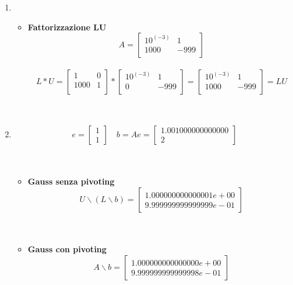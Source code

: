 \begin{enumerate}
	\item 
	\begin{itemize}
		\item \textbf{Fattorizzazione LU}
			\[
			A =\begin{bmatrix}
				10^{(-3)} &   1  \\
	 			1000   & -999 \\
			\end{bmatrix}
			\]\\
			\[
			L*U =\begin{bmatrix}
				1    & 0 \\
				1000 & 1 \\
			\end{bmatrix} *
			\begin{bmatrix}
				10^{(-3)} & 1    \\
				0      	  & -999 \\
			\end{bmatrix} 
			= \begin{bmatrix}
				10^{(-3)} &   1  \\
				1000   & -999 \\
			\end{bmatrix} = LU
			\]\\\
	\end{itemize}
	\item
		\[
		e = \begin{bmatrix}
			1 \\
			1
		\end{bmatrix} \quad 
		b = Ae =\begin{bmatrix}
			1.001000000000000 \\
			2                 
		\end{bmatrix}
		\]\\\
	\begin{itemize}
	\item \textbf{Gauss senza pivoting}
		\[
		U \backslash (L \backslash b) = \begin{bmatrix}
			1.000000000000001e+00 \\
    		9.999999999999999e-01
		\end{bmatrix}
		\]\\\
	\end{itemize}
	\begin{itemize}
	\item \textbf{Gauss con pivoting}
		\[
		A \backslash b =\begin{bmatrix}
			1.000000000000000e+00 \\
    		9.999999999999998e-01 
		\end{bmatrix}
		\]
	\end{itemize}
\end{enumerate}